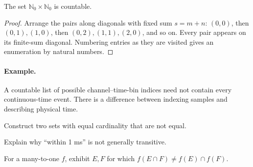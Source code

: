 

\begin{proposition}The set $\mathbb N_0\times\mathbb N_0$ is countable.\end{proposition}
\begin{proof}Arrange the pairs along diagonals with fixed sum $s=m+n$: $(0,0)$, then $(0,1),(1,0)$, then $(0,2),(1,1),(2,0)$, and so on. Every pair appears on its finite-sum diagonal. Numbering entries as they are visited gives an enumeration by natural numbers.\end{proof}
\paragraph{Example.} A countable list of possible channel--time-bin indices need not contain every continuous-time event. There is a difference between indexing samples and describing physical time.



\begin{exercises}
\item Construct two sets with equal cardinality that are not equal.
\item Explain why ``within 1 ms'' is not generally transitive.
\item For a many-to-one $f$, exhibit $E,F$ for which $f(E\cap F)\neq f(E)\cap f(F)$.
\end{exercises}